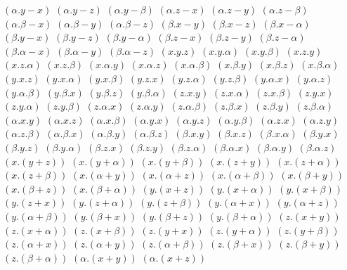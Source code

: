 $ (\alpha . y - x) $
$ (\alpha . y - z) $
$ (\alpha . y - \beta) $
$ (\alpha . z - x) $
$ (\alpha . z - y) $
$ (\alpha . z - \beta) $
$ (\alpha . \beta - x) $
$ (\alpha . \beta - y) $
$ (\alpha . \beta - z) $
$ (\beta . x - y) $
$ (\beta . x - z) $
$ (\beta . x - \alpha) $
$ (\beta . y - x) $
$ (\beta . y - z) $
$ (\beta . y - \alpha) $
$ (\beta . z - x) $
$ (\beta . z - y) $
$ (\beta . z - \alpha) $
$ (\beta . \alpha - x) $
$ (\beta . \alpha - y) $
$ (\beta . \alpha - z) $
$ (x . y . z) $
$ (x . y . \alpha) $
$ (x . y . \beta) $
$ (x . z . y) $
$ (x . z . \alpha) $
$ (x . z . \beta) $
$ (x . \alpha . y) $
$ (x . \alpha . z) $
$ (x . \alpha . \beta) $
$ (x . \beta . y) $
$ (x . \beta . z) $
$ (x . \beta . \alpha) $
$ (y . x . z) $
$ (y . x . \alpha) $
$ (y . x . \beta) $
$ (y . z . x) $
$ (y . z . \alpha) $
$ (y . z . \beta) $
$ (y . \alpha . x) $
$ (y . \alpha . z) $
$ (y . \alpha . \beta) $
$ (y . \beta . x) $
$ (y . \beta . z) $
$ (y . \beta . \alpha) $
$ (z . x . y) $
$ (z . x . \alpha) $
$ (z . x . \beta) $
$ (z . y . x) $
$ (z . y . \alpha) $
$ (z . y . \beta) $
$ (z . \alpha . x) $
$ (z . \alpha . y) $
$ (z . \alpha . \beta) $
$ (z . \beta . x) $
$ (z . \beta . y) $
$ (z . \beta . \alpha) $
$ (\alpha . x . y) $
$ (\alpha . x . z) $
$ (\alpha . x . \beta) $
$ (\alpha . y . x) $
$ (\alpha . y . z) $
$ (\alpha . y . \beta) $
$ (\alpha . z . x) $
$ (\alpha . z . y) $
$ (\alpha . z . \beta) $
$ (\alpha . \beta . x) $
$ (\alpha . \beta . y) $
$ (\alpha . \beta . z) $
$ (\beta . x . y) $
$ (\beta . x . z) $
$ (\beta . x . \alpha) $
$ (\beta . y . x) $
$ (\beta . y . z) $
$ (\beta . y . \alpha) $
$ (\beta . z . x) $
$ (\beta . z . y) $
$ (\beta . z . \alpha) $
$ (\beta . \alpha . x) $
$ (\beta . \alpha . y) $
$ (\beta . \alpha . z) $
$ (x . (y + z)) $
$ (x . (y + \alpha)) $
$ (x . (y + \beta)) $
$ (x . (z + y)) $
$ (x . (z + \alpha)) $
$ (x . (z + \beta)) $
$ (x . (\alpha + y)) $
$ (x . (\alpha + z)) $
$ (x . (\alpha + \beta)) $
$ (x . (\beta + y)) $
$ (x . (\beta + z)) $
$ (x . (\beta + \alpha)) $
$ (y . (x + z)) $
$ (y . (x + \alpha)) $
$ (y . (x + \beta)) $
$ (y . (z + x)) $
$ (y . (z + \alpha)) $
$ (y . (z + \beta)) $
$ (y . (\alpha + x)) $
$ (y . (\alpha + z)) $
$ (y . (\alpha + \beta)) $
$ (y . (\beta + x)) $
$ (y . (\beta + z)) $
$ (y . (\beta + \alpha)) $
$ (z . (x + y)) $
$ (z . (x + \alpha)) $
$ (z . (x + \beta)) $
$ (z . (y + x)) $
$ (z . (y + \alpha)) $
$ (z . (y + \beta)) $
$ (z . (\alpha + x)) $
$ (z . (\alpha + y)) $
$ (z . (\alpha + \beta)) $
$ (z . (\beta + x)) $
$ (z . (\beta + y)) $
$ (z . (\beta + \alpha)) $
$ (\alpha . (x + y)) $
$ (\alpha . (x + z)) $
